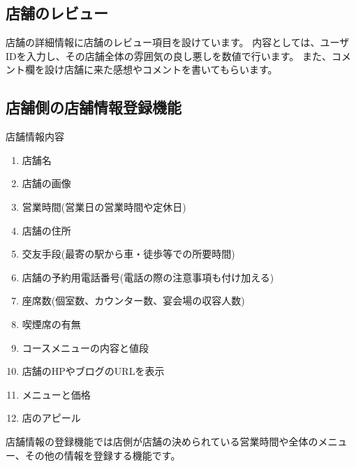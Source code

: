 \documentclass[a4j,titlepage]{jarticle}
\begin{document}
\subsection{店舗のレビュー}
店舗の詳細情報に店舗のレビュー項目を設けています。
内容としては、ユーザIDを入力し、その店舗全体の雰囲気の良し悪しを数値で行います。
また、コメント欄を設け店舗に来た感想やコメントを書いてもらいます。

\subsection{店舗側の店舗情報登録機能}
店舗情報内容
\begin{enumerate}
\item 店舗名
\item 店舗の画像
\item 営業時間(営業日の営業時間や定休日)
\item 店舗の住所
\item 交友手段(最寄の駅から車・徒歩等での所要時間)
\item 店舗の予約用電話番号(電話の際の注意事項も付け加える)
\item 座席数(個室数、カウンター数、宴会場の収容人数)
\item 喫煙席の有無
\item コースメニューの内容と値段
\item 店舗のHPやブログのURLを表示
\item メニューと価格
\item 店のアピール
\end{enumerate}

店舗情報の登録機能では店側が店舗の決められている営業時間や全体のメニュー、その他の情報を登録する機能です。
\end{document}
